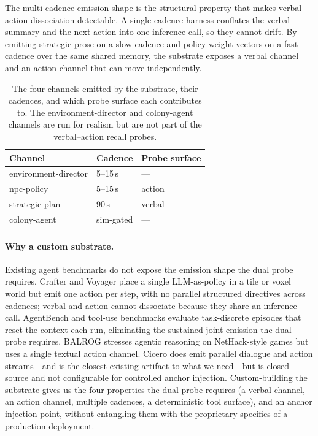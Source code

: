 The multi-cadence emission shape is the structural property that
makes verbal--action dissociation detectable. A single-cadence
harness conflates the verbal summary and the next action into one
inference call, so they cannot drift. By emitting strategic prose
on a slow cadence and policy-weight vectors on a fast cadence over
the same shared memory, the substrate exposes a verbal channel and
an action channel that can move independently.

\begin{table}[t]
  \centering
  \footnotesize
  \begin{tabular}{l l l}
    \toprule
    Channel & Cadence & Probe surface \\
    \midrule
    environment-director & 5--15\,s & --- \\
    npc-policy           & 5--15\,s & action \\
    strategic-plan       & 90\,s    & verbal \\
    colony-agent         & sim-gated & --- \\
    \bottomrule
  \end{tabular}
  \caption{The four channels emitted by the substrate, their
  cadences, and which probe surface each contributes to. The
  environment-director and colony-agent channels are run for
  realism but are not part of the verbal--action recall probes.}
  \label{tab:channels}
\end{table}

\paragraph{Why a custom substrate.}
Existing agent benchmarks do not expose the emission shape the
dual probe requires. Crafter \citep{Hafner2022Crafter} and Voyager
\citep{Wang2023Voyager} place a single LLM-as-policy in a tile or
voxel world but emit one action per step, with no parallel
structured directives across cadences; verbal and action cannot
dissociate because they share an inference call. AgentBench
\citep{Liu2024AgentBench} and tool-use benchmarks evaluate
task-discrete episodes that reset the context each run,
eliminating the sustained joint emission the dual probe requires.
BALROG \citep{Paglieri2025BALROG} stresses agentic reasoning on
NetHack-style games but uses a single textual action channel.
Cicero \citep{FAIR2022Cicero} does emit parallel dialogue and
action streams---and is the closest existing artifact to what we
need---but is closed-source and not configurable for controlled
anchor injection. Custom-building the substrate gives us the four
properties the dual probe requires (a verbal channel, an action
channel, multiple cadences, a deterministic tool surface), and an
anchor injection point, without entangling them with the
proprietary specifics of a production deployment.


